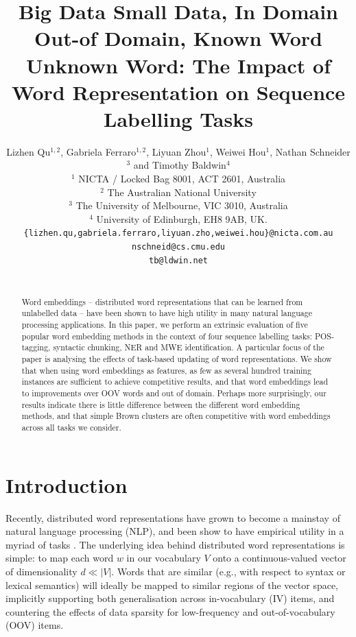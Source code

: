 \documentclass[11pt]{article}
\title{Big Data Small Data, In Domain Out-of Domain, Known Word Unknown
  Word: The Impact of Word Representation on Sequence Labelling Tasks}
\author{
Lizhen Qu$^{1,2}$, Gabriela Ferraro$^{1,2}$, Liyuan Zhou$^1$, Weiwei Hou$^1$, Nathan Schneider$^3$ and Timothy Baldwin$^4$ \\
$^1$ NICTA / Locked Bag 8001, ACT 2601, Australia \\
$^2$ The Australian National University\\
$^3$ The University of Melbourne, VIC 3010, Australia \\
$^4$ University of Edinburgh, EH8 9AB, UK.  \\
{\tt \{lizhen.qu,gabriela.ferraro,liyuan.zho,weiwei.hou\}@nicta.com.au}\\
{\tt nschneid@cs.cmu.edu}\\
{\tt tb@ldwin.net}\\ 
~~\\
}
\date{}
\begin{document}
\maketitle


\begin{abstract} 
  Word embeddings -- distributed word representations that can be
  learned from unlabelled data -- have been shown to have high utility
  in many natural language processing applications. 
  In this paper, we perform an extrinsic evaluation of five popular word
  embedding methods in the context of four sequence labelling tasks:
  POS-tagging, syntactic chunking, NER and MWE identification.
  A particular focus of the paper is analysing the effects of task-based
  updating of word representations.
  We show that when using word embeddings as features, as few as
  several hundred training instances are sufficient to achieve competitive
  results, and that word embeddings lead to improvements over OOV words
  and out of domain.
  Perhaps more surprisingly, our results indicate there is little
  difference between the different word embedding methods, and that simple
  Brown clusters are often competitive with word embeddings across all
  tasks we consider. 
\end{abstract}

\newcommand{\gabi}[1]{\textcolor{blue}{#1}}
\newcommand{\tim}[1]{\textcolor{red}{#1}}
\newcommand{\lizhen}[1]{\textcolor{green}{#1}}
\newcommand{\nss}[1]{\textcolor{magenta}{#1}}

%
%
%
%
%
%


\section{Introduction}

Recently, distributed word representations have grown to become a
mainstay of natural language processing (NLP), and been show to have
empirical utility in a myriad of tasks
\cite{Collobert2008,turian2010word,baroni:2014,Andreas:Klein:2014}.  The
underlying idea behind distributed word representations is simple: to
map each word $w$ in our vocabulary $V$ onto a continuous-valued vector
of dimensionality $d \ll |V|$.  Words that are similar
(e.g., with respect to syntax or lexical semantics) will ideally be mapped to
similar regions of the vector space, implicitly supporting both
generalisation across in-vocabulary (IV) items, and countering the
effects of data sparsity for low-frequency and out-of-vocabulary (OOV)
items.
\end{document}
